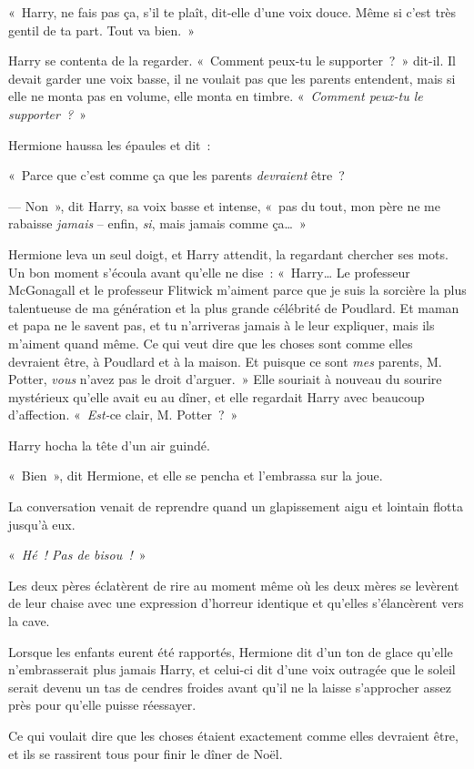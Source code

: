 «~Harry, ne fais pas ça, s'il te plaît, dit-elle d'une voix douce. Même si c'est très gentil de ta part. Tout va bien.~»

Harry se contenta de la regarder. «~Comment peux-tu le supporter~?~» dit-il. Il devait garder une voix basse, il ne voulait pas que les parents entendent, mais si elle ne monta pas en volume, elle monta en timbre. «~\emph{Comment peux-tu le supporter~?}~»

Hermione haussa les épaules et dit~:

«~Parce que c'est comme ça que les parents \emph{devraient} être~?

--- Non~», dit Harry, sa voix basse et intense, «~pas du tout, mon père ne me rabaisse \emph{jamais} -- enfin, \emph{si}, mais jamais comme ça…~»

Hermione leva un seul doigt, et Harry attendit, la regardant chercher ses mots. Un bon moment s'écoula avant qu'elle ne dise~: «~Harry… Le professeur McGonagall et le professeur Flitwick m'aiment parce que je suis la sorcière la plus talentueuse de ma génération et la plus grande célébrité de Poudlard. Et maman et papa ne le savent pas, et tu n'arriveras jamais à le leur expliquer, mais ils m'aiment quand même. Ce qui veut dire que les choses sont comme elles devraient être, à Poudlard et à la maison. Et puisque ce sont \emph{mes} parents, M. Potter, \emph{vous} n'avez pas le droit d'arguer.~» Elle souriait à nouveau du sourire mystérieux qu'elle avait eu au dîner, et elle regardait Harry avec beaucoup d'affection. «~\emph{Est-}ce clair, M. Potter~?~»

Harry hocha la tête d'un air guindé.

«~Bien~», dit Hermione, et elle se pencha et l'embrassa sur la joue.

\later

La conversation venait de reprendre quand un glapissement aigu et lointain flotta jusqu'à eux.

«~\emph{Hé~! Pas de bisou~!}~»

Les deux pères éclatèrent de rire au moment même où les deux mères se levèrent de leur chaise avec une expression d'horreur identique et qu'elles s'élancèrent vers la cave.

Lorsque les enfants eurent été rapportés, Hermione dit d'un ton de glace qu'elle n'embrasserait plus jamais Harry, et celui-ci dit d'une voix outragée que le soleil serait devenu un tas de cendres froides avant qu'il ne la laisse s'approcher assez près pour qu'elle puisse réessayer.

Ce qui voulait dire que les choses étaient exactement comme elles devraient être, et ils se rassirent tous pour finir le dîner de Noël.

